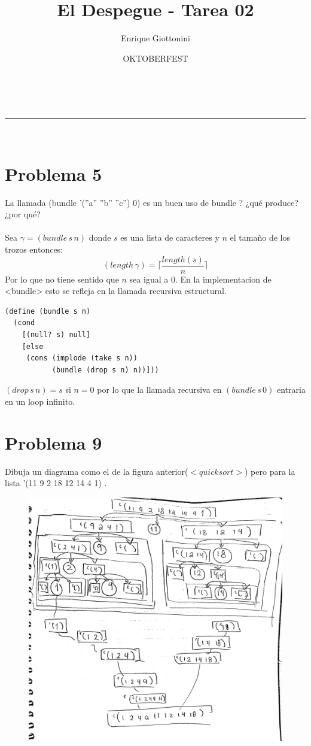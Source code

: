 \documentclass[a4paper,11pt]{article}
\makeatletter
\newcommand{\linia}{\rule{\linewidth}{0.5pt}}
\theoremstyle{mytheor}
\renewcommand{\maketitle}{
\begin{center}
\vspace{2ex}
{\huge \textsc{\@title}}
\vspace{1ex}
\\
\linia\\
\@author \hfill \@date
\vspace{4ex}
\end{center}
}
\makeatother
\begin{document}
\title{El Despegue - Tarea \textnumero{} 02}

\author{Enrique Giottonini}

\date{OKTOBERFEST}

\maketitle

\section*{Problema 5}
La llamada (bundle ’(”a” ”b” ”c”) 0) es un buen uso de bundle ? ¿qué produce?
¿por qué? \\ \\
Sea $\gamma = (bundle\, s\, n)$ donde $s$ es una lista de caracteres y $n$ el tamaño de los trozos entonces:
\[ (length\,\gamma) = \Big \lceil \dfrac{length(s)}{n}\Big \rceil\]
Por lo que no tiene sentido que $n$ sea igual a 0. En la implementacion de <bundle> esto se refleja en la llamada recursiva estructural.

\begin{lstlisting}[title=bundle]
(define (bundle s n)
  (cond
    [(null? s) null]
    [else
     (cons (implode (take s n))
           (bundle (drop s n) n))]))
\end{lstlisting}

$(drop \,s \,n) = s$ si $n=0$ por lo que la llamada recursiva  en $(bundle\, s\, 0)$ entraria en un loop infinito.
\\
 

\section*{Problema 9}
Dibuja un diagrama como el de la figura anterior($<quicksort>$) pero para la lista ’(11 9 2 18 12
14 4 1) .

\begin{figure}[t]
\includegraphics[width=15cm]{img}
\centering
\end{figure}
\end{document}
